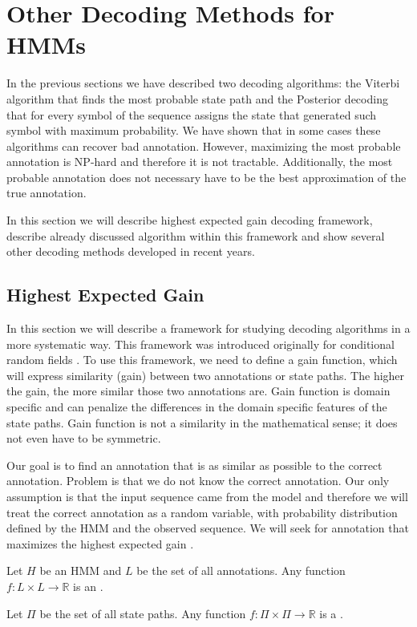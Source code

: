 \section{Other Decoding Methods for HMMs}
In the previous sections we have described two decoding algorithms: the Viterbi algorithm
that finds the most probable state path  and the Posterior decoding that for
every symbol of the sequence assigns the state that generated such symbol with
maximum probability. 
We have shown that in some cases these algorithms can recover bad
annotation. However, maximizing the most probable annotation is NP-hard and
therefore it is not tractable. Additionally, the most probable annotation does
not necessary have to be the best approximation of the true annotation.

In this section we will describe highest expected gain decoding framework,
describe already discussed algorithm within this framework and show several
other decoding methods developed in recent years.

\subsection{Highest Expected Gain}

\label{SECTION:HEG}

In this section we will describe a framework for studying decoding algorithms in
a more systematic way. This framework was introduced  originally for
conditional random fields \cite{Gross2007}.  To use this framework, we need to
define a gain function, which will express similarity (gain) between two
annotations or state paths. The higher the gain, the more similar those two
annotations are. Gain function is domain specific and can penalize the differences
in the domain specific features of the state paths.  Gain function is not a
similarity in the mathematical sense; it does not even have to be symmetric.

Our goal is to find an annotation that is as similar as possible to the correct
annotation. Problem is that we do not know the correct annotation. Our only
assumption is that the input sequence came from the model and therefore we will
treat the correct annotation as a random variable, with probability distribution
defined by the HMM and the observed sequence. We will seek for annotation that
maximizes the highest expected gain \cite{Nanasi2010,Nanasi2010mgr}.

\begin{definition}
Let $H$ be an HMM and $L$ be the set of all annotations. Any function
$f:L\times L\to \mathbb{R}$ is an .

Let $\Pi$ be the set of all state paths. Any function $f:\Pi\times
\Pi\to\mathbb{R}$ is a .
\label{DEFINITION:GAINFUNCTION}
\end{definition}

